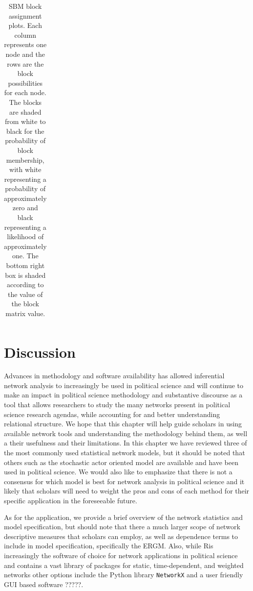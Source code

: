 \documentclass[fleqn,12pt]{wlscirep}
\newcommand{\R}{\textsf{R}\space} %
\begin{document}
\begin{longtable}[!h]{c@{\hskip 0cm}c}
\caption{\label{fig:SBM_plot_1} SBM block assignment plots. Each column represents one node and the rows are the block possibilities for each node. The blocks are shaded from white to black for the probability of block membership, with white representing a probability of approximately zero and black representing a likelihood of approximately one. The bottom right box is shaded according to the value of the block matrix value.}
\end{longtable}


\section{Discussion}

Advances in methodology and software availability has allowed inferential network analysis to increasingly be used in political science and will continue to make an impact in political science methodology and substantive discourse as a tool that allows researchers to study the many networks present in political science research agendas, while accounting for and better understanding relational structure. We hope that this chapter will help guide scholars in using available network tools and understanding the methodology behind them, as well a their usefulness and their limitations. In this chapter we have reviewed three of the most commonly used statistical network models, but it should be noted that others such as the stochastic actor oriented model are available and have been used in political science. We would also like to emphasize that there is not a consensus for which model is best for network analysis in political science and it likely that scholars will need to weight the pros and cons of each method for their specific application in the foreseeable future.

As for the application, we provide a brief overview of the network statistics and model specification, but should note that there a much larger scope of network descriptive measures that scholars can employ, as well as dependence terms to include in model specification, specifically the ERGM. Also, while \R is increasingly the software of choice for network applications in political science and contains a vast library of packages for static, time-dependent, and weighted networks other options include the \textsf{Python} library \texttt{NetworkX} and a user friendly GUI based software ?????. 






\clearpage



\end{document}
